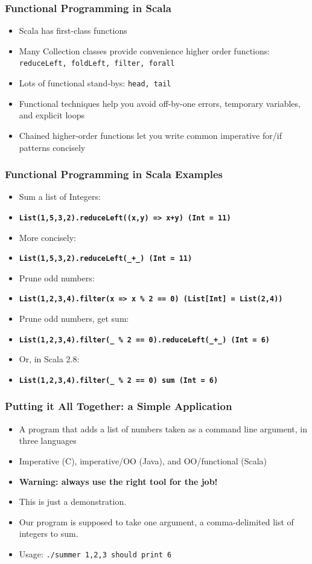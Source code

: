 \documentclass[hyperref={colorlinks=true}]{beamer}
\begin{document}
\begin{frame} 
\frametitle{Functional Programming in Scala}
\begin{itemize}
  \item<1-> Scala has first-class functions
  \item<2-> Many Collection classes provide convenience higher order functions: \tt\small{reduceLeft, foldLeft, filter, forall}
  \item<3-> Lots of functional stand-bys: \tt\small{head, tail}
  \item<4-> Functional techniques help you avoid off-by-one errors, temporary variables, and explicit loops
  \item<5-> Chained higher-order functions let you write common imperative for/if patterns concisely
\end{itemize}
\end{frame} 

\begin{frame} 
\frametitle{Functional Programming in Scala Examples}
\begin{itemize}
  \item<1-> Sum a list of Integers:
  \item<1-> \tt\small\textbf{List(1,5,3,2).reduceLeft((x,y) => x+y) (Int = 11)}
  \item<2-> More concisely:
  \item<2-> \tt\small\textbf{List(1,5,3,2).reduceLeft(\_+\_) (Int = 11)}
  \item<3-> Prune odd numbers:
  \item<3-> \tt\small\textbf{List(1,2,3,4).filter(x => x \% 2 == 0) (List[Int] = List(2,4))}
  \item<4-> Prune odd numbers, get sum:
  \item<4-> \tt\small\textbf{List(1,2,3,4).filter(\_ \% 2 == 0).reduceLeft(\_+\_) (Int = 6)}
  \item<5-> Or, in Scala 2.8:
  \item<5-> \tt\small\textbf{List(1,2,3,4).filter(\_ \% 2 == 0) sum (Int = 6)}
\end{itemize}
\end{frame} 

\begin{frame} 
\frametitle{Putting it All Together: a Simple Application}
\begin{itemize}
  \item<1-> A program that adds a list of numbers taken as a command line argument, in three languages 
  \item<2-> Imperative (C), imperative/OO (Java), and OO/functional (Scala)
  \item<3-> \textbf{Warning: always use the right tool for the job!}
  \item<3-> This is just a demonstration.
  \item<5-> Our program is supposed to take one argument, a comma-delimited list of integers to sum.
  \item<6-> Usage: \tt{./summer 1,2,3} should print 6
\end{itemize}
\end{frame} 
\end{document}
